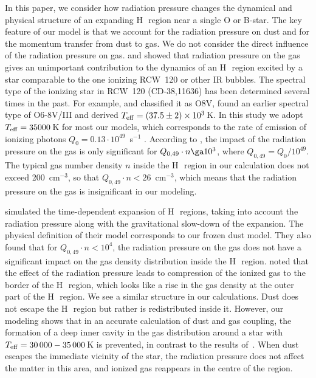 \documentclass[a4paper,fleqn,usenatbib]{mnras}
\newcommand{\hii}    {H\,{\sc{ii}}~}
\begin{document}
In this paper, we consider how radiation pressure changes the dynamical and physical structure of an expanding \hii region near a single O or B-star. The key feature of our model is that we account for the radiation pressure on dust and for the momentum transfer from dust to gas. We do not consider the direct influence of the radiation pressure on gas. \cite{Krumholz_09} and \cite{Draine2011} showed that radiation pressure on the gas gives an unimportant contribution to the dynamics of an \hii region excited by a star comparable to the one ionizing RCW~120 or other IR bubbles. The spectral type of the ionizing star in RCW~120 (CD-38,11636) has been determined several times in the past. For example, \citet{georgelin_70} and \citet{Avedisova_84} classified it as O8V, \citet{Martins_10} found an earlier spectral type of O6-8V/III and derived $T_{\rm eff}=(37.5 \pm 2)\times 10^3$\,K. In this study we adopt $T_{\rm eff}=35000$\,K for most our models, which corresponds to the rate of emission of ionizing photons $Q_{0}= 0.13 \cdot 10^{49}$~s$^{-1}$ \citep{1984ApJ...283..165T}. According to \citet{Draine2011}, the impact of the  radiation pressure on the gas is only significant for $Q_{0,49}\cdot n\ga10^3$, where $Q_{0,49} = Q_0 /10^{49}$. The typical gas number density $n$ inside the \hii region in our calculation does not exceed 200~cm$^{-3}$, so that $Q_{0,49}\cdot n<26$~cm$^{-3}$, which means that the radiation pressure on the gas is insignificant in our modeling. 

\citet{Kim_2016} simulated the time-dependent expansion of \hii regions, taking into account the radiation pressure along with the gravitational slow-down of the expansion. The physical definition of their model corresponds to our frozen dust model. They also found that for $Q_{0,49}\cdot n < 10^4$, the radiation pressure on the gas does not have a significant impact on the gas density distribution inside the \hii region. \citet{Kim_2016} noted that the effect of the radiation pressure leads to compression of the ionized gas to the border of the \hii region, which looks like a rise in the gas density at the outer part of the \hii region. We see a similar structure in our calculations. Dust does not escape the \hii region but  rather is redistributed inside it. However, our modeling shows that in an accurate calculation of dust and gas coupling, the formation of a deep inner cavity in the gas distribution around a star with $T_{\rm eff}=30\,000 - 35\,000$\,K is prevented, in contrast to the results of~\citet{Kim_2016}. When dust escapes the immediate vicinity of the star, the radiation pressure does not affect the matter in this area, and ionized gas reappears in the centre of the region.
\end{document}
